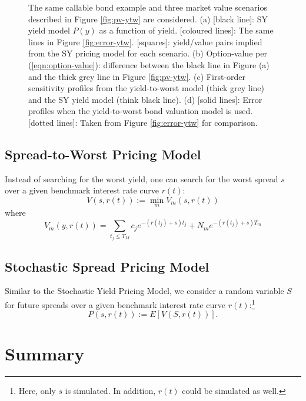 \documentclass[10pt,a4paper]{article}
\begin{document}
\begin{figure}[h!]
\begin{center}
	\end{center}

	\caption{
		The same callable bond example and three market value scenarios described in Figure \ref{fig:pv-ytw} are considered. 
		(a) [black line]: SY yield model $P(y)$ as a function of yield. 
		[coloured lines]: The same lines in Figure \ref{fig:error-ytw}. 
		[squares]: yield/value pairs implied from the SY pricing model for each scenario.
		(b) Option-value per (\ref{eqn:option-value}): difference between the black line in Figure (a) and the thick grey line in Figure \ref{fig:pv-ytw}.
		(c) First-order sensitivity profiles from the yield-to-worst model (thick grey line) and the SY yield model (think black line). 
		(d) [solid lines]: Error profiles when the yield-to-worst bond valuation model is used. [dotted lines]: Taken from Figure \ref{fig:error-ytw} for comparison.
		}
	\label{fig:pv-sy}
\end{figure}


\subsection{Spread-to-Worst Pricing Model}

Instead of searching for the worst yield, one can search for the worst spread $s$ over a given benchmark interest rate curve $r(t)$:
\begin{equation}
V(s, r(t)) := \min_m V_m(s, r(t))
\end{equation}
where
\begin{equation}
V_m(y, r(t)) = \sum_{t_j \le T_M} c_j  e^{-(r(t_j) + s)t_j} + N_m e^{-(r(t_j) + s)T_m}
\label{eqn:valuation-non-callable-bond-spread}
\end{equation}


\subsection{Stochastic Spread Pricing Model}

Similar to the Stochastic Yield Pricing Model, we consider a random variable $S$ for future spreads over a given benchmark interest rate curve $r(t)$:\footnote{Here, only $s$ is simulated. In addition, $r(t)$ could be simulated as well.}
\begin{equation}
P(s, r(t)) := E\left[V(S,r(t))\right].
\end{equation}


\section{Summary}
\end{document}
